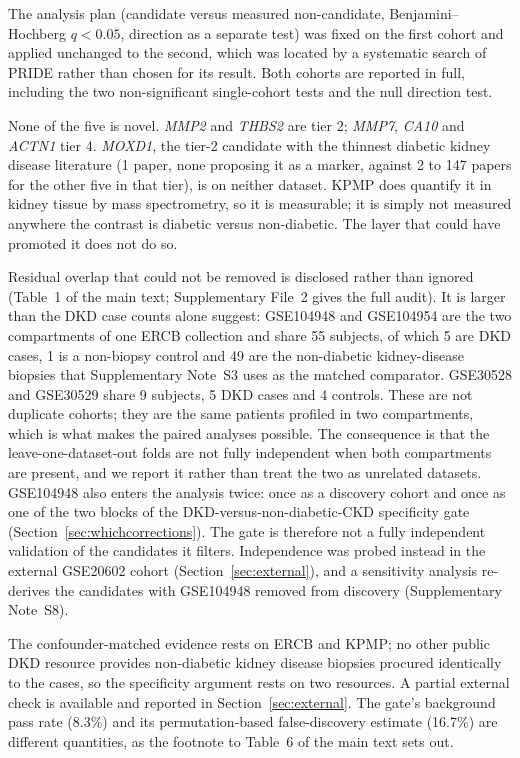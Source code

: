 \documentclass[11pt]{article}
\begin{document}
The analysis plan (candidate versus measured non-candidate, Benjamini--Hochberg \cite{benjamini1995} $q < 0.05$,
direction as a separate test) was fixed on the first cohort and applied unchanged to the
second, which was located by a systematic search of PRIDE rather than chosen for its result.
Both cohorts are reported in full, including the two non-significant single-cohort tests and
the null direction test.

None of the five is novel. \textit{MMP2} and \textit{THBS2} are tier 2; \textit{MMP7}, \textit{CA10} and
\textit{ACTN1} tier 4. \textit{MOXD1}, the tier-2 candidate with the thinnest diabetic kidney disease
literature (1 paper, none proposing it as a marker, against 2 to 147 papers for the other
five in that tier), is on neither dataset. KPMP does quantify it in kidney tissue by mass
spectrometry, so it is measurable; it is simply not measured anywhere the contrast is
diabetic versus non-diabetic. The layer that could have promoted it does not do so.



\label{note:S8}
Residual overlap that could not be removed is disclosed rather than ignored (Table~1 of the main text; Supplementary File~2 gives the full audit). It is larger than the DKD case counts alone suggest: GSE104948 and GSE104954 are the two compartments of one ERCB collection and share 55 subjects, of which 5 are DKD cases, 1 is a non-biopsy control and 49 are the non-diabetic kidney-disease biopsies that Supplementary Note~S3 uses as the matched comparator. GSE30528 and GSE30529 share 9 subjects, 5 DKD cases and 4 controls. These are not duplicate cohorts; they are the same patients profiled in two compartments, which is what makes the paired analyses possible. The consequence is that the leave-one-dataset-out folds are not fully independent when both compartments are present, and we report it rather than treat the two as unrelated datasets. GSE104948 also enters the analysis twice: once as a discovery cohort and once as one of the two blocks of the DKD-versus-non-diabetic-CKD specificity gate (Section~\ref{sec:whichcorrections}). The gate is therefore not a fully independent validation of the candidates it filters. Independence was probed instead in the external GSE20602 cohort (Section~\ref{sec:external}), and a sensitivity analysis re-derives the candidates with GSE104948 removed from discovery (Supplementary Note~S8).




The confounder-matched evidence rests on ERCB and KPMP; no other public DKD resource provides
non-diabetic kidney disease biopsies procured identically to the cases, so the specificity
argument rests on two resources. A partial external check is available and reported in
Section~\ref{sec:external}. The gate's background pass rate (8.3\%) and its permutation-based false-discovery estimate (16.7\%) are different quantities, as the footnote to Table~6 of the main text sets out.
\end{document}
